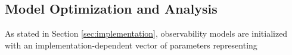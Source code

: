 \subsection{Model Optimization and Analysis}

As stated in Section \ref{sec:implementation}, observability models are initialized with an implementation-dependent vector of parameters representing 

\subsubsection{}